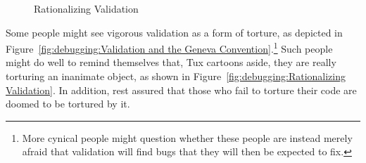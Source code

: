 \begin{figure}[tb]
\begin{center}
\end{center}
\caption{Rationalizing Validation}
\end{figure}

Some people might see vigorous validation as a form of torture, as
depicted in
Figure~\ref{fig:debugging:Validation and the Geneva Convention}.\footnote{
	More cynical people might question whether these people are instead
	merely afraid that validation will find bugs that they will then
	be expected to fix.}
Such people might do well to remind themselves that, Tux cartoons aside,
they are really torturing an inanimate object, as shown in
Figure~\ref{fig:debugging:Rationalizing Validation}.
In addition, rest assured that those who fail to torture their code are
doomed to be tortured by it.


